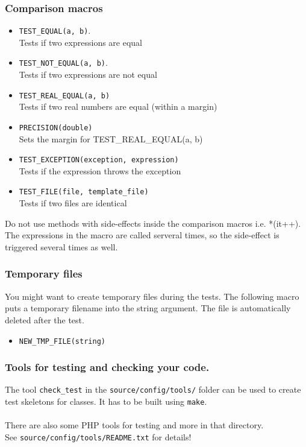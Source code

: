 \documentclass[a4]{article}
\begin{document}
\subsubsection{Comparison macros}
\begin{itemize}
        \item {\tt TEST\_EQUAL(a, b)}.\\ Tests if two expressions are equal
        \item {\tt TEST\_NOT\_EQUAL(a, b)}.\\ Tests if two expressions are not equal
        \item {\tt TEST\_REAL\_EQUAL(a, b)} \\ Tests if two real numbers are equal (within a margin)
        \item {\tt PRECISION(double)} \\ Sets the margin for TEST\_REAL\_EQUAL(a, b)
        \item {\tt TEST\_EXCEPTION(exception, expression)} \\ Tests if the expression throws the exception
        \item {\tt TEST\_FILE(file, template\_file)} \\ Tests if two files are identical
\end{itemize}
Do not use methods with side-effects inside the comparison macros i.e. *(it++). The expressions
in the macro are called serveral times, so the side-effect is triggered several times as well. 

\subsubsection{Temporary files}
You might want to create temporary files during the tests. The following macro 
puts a temporary filename into the string argument. The file is automatically deleted
after the test.
\begin{itemize}
        \item {\tt NEW\_TMP\_FILE(string)}
\end{itemize}

\subsubsection{Tools for testing and checking your code.}
The tool {\tt check\_test} in the {\tt source/config/tools/} folder can be used to
create test skeletons for classes. It has to be built using {\tt make}.\\
\\
There are also some PHP tools for testing and more in that directory.\\
See {\tt source/config/tools/README.txt} for details!
\end{document}
